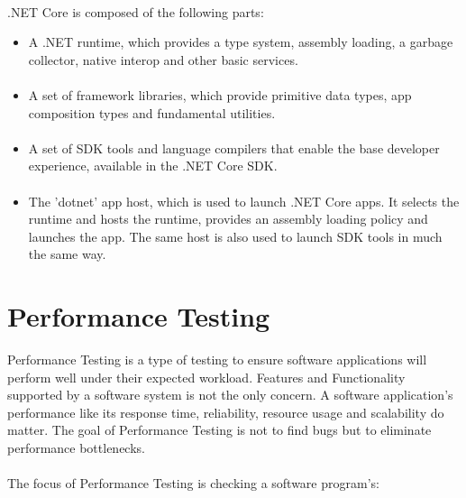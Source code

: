 \documentclass[../thesis.tex]{subfiles}
\begin{document}
\paragraph{}
.NET Core is composed of the following parts:
\begin{itemize}
\item A .NET runtime, which provides a type system, assembly loading, a garbage collector, native interop and other basic services.
\paragraph{}
\item A set of framework libraries, which provide primitive data types, app composition types and fundamental utilities.
\paragraph{}
\item A set of SDK tools and language compilers that enable the base developer experience, available in the .NET Core SDK.
\paragraph{}
\item The 'dotnet' app host, which is used to launch .NET Core apps. It selects the runtime and hosts the runtime, provides an assembly loading policy and launches the app. The same host is also used to launch SDK tools in much the same way.
\end{itemize}

\section{Performance Testing}
Performance Testing is a type of testing to ensure software applications will perform well under their expected workload. Features and Functionality supported by a software system is not the only concern. A software application's performance like its response time, reliability, resource usage and scalability do matter. The goal of Performance Testing is not to find bugs but to eliminate performance bottlenecks.
\paragraph{}
The focus of Performance Testing is checking a software program's:
\end{document}
